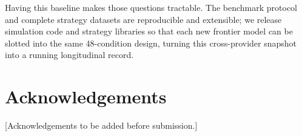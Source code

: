 Having this baseline makes those questions tractable.
The benchmark protocol and complete strategy datasets are reproducible
and extensible; %
we release simulation code and strategy libraries so that each new
frontier model can be slotted into the same 48-condition design,
turning this cross-provider snapshot into a running longitudinal record.

\section*{Acknowledgements}
[Acknowledgements to be added before submission.]
